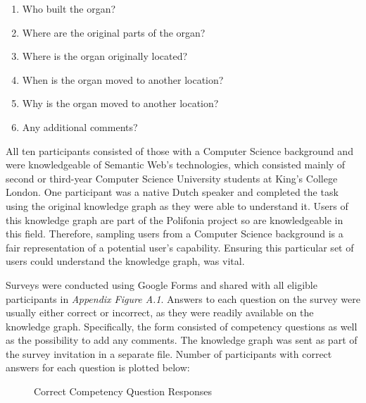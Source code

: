 \begin{enumerate}
    \item Who built the organ?
    \vspace{-0.25cm}
    \item Where are the original parts of the organ?
    \vspace{-0.25cm}
    \item Where is the organ originally located?
    \vspace{-0.25cm}
    \item When is the organ moved to another location?
    \vspace{-0.25cm}
    \item Why is the organ moved to another location? 
    \vspace{-0.25cm}
    \item Any additional comments?
\end{enumerate}

All ten participants consisted of those with a Computer Science background and were knowledgeable of Semantic Web's technologies, which consisted mainly of second or third-year Computer Science University students at King's College London. One participant was a native Dutch speaker and completed the task using the original knowledge graph as they were able to understand it. Users of this knowledge graph are part of the Polifonia project so are knowledgeable in this field. Therefore, sampling users from a Computer Science background is a fair representation of a potential user's capability. Ensuring this particular set of users could understand the knowledge graph, was vital. 

Surveys were conducted using Google Forms and shared with all eligible participants in \textit{Appendix Figure A.1}. Answers to each question on the survey were usually either correct or incorrect, as they were readily available on the knowledge graph. Specifically, the form consisted of competency questions as well as the possibility to add any comments. The knowledge graph was sent as part of the survey invitation in a separate file. Number of participants with correct answers for each question is plotted below: 

\begin{figure}[H]
\begin{center}
\end{center}
\vspace{-0.8cm}
\caption{Correct Competency Question Responses}
\end{figure}
\vspace{-0.15cm}

